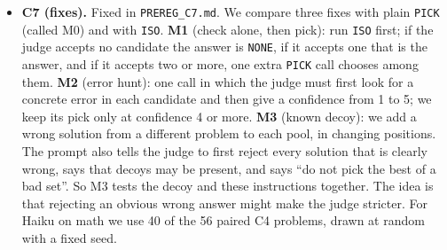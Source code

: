 \documentclass[10pt,twocolumn]{article}
\begin{document}
\begin{itemize}
\item \textbf{C7 (fixes).} Fixed in \texttt{PREREG\_C7.md}. We compare three fixes with plain \texttt{PICK} (called M0) and with \texttt{ISO}. \textbf{M1} (check alone, then pick): run \texttt{ISO} first; if the judge accepts no candidate the answer is \texttt{NONE}, if it accepts one that is the answer, and if it accepts two or more, one extra \texttt{PICK} call chooses among them. \textbf{M2} (error hunt): one call in which the judge must first look for a concrete error in each candidate and then give a confidence from 1 to 5; we keep its pick only at confidence 4 or more. \textbf{M3} (known decoy): we add a wrong solution from a different problem to each pool, in changing positions. The prompt also tells the judge to first reject every solution that is clearly wrong, says that decoys may be present, and says ``do not pick the best of a bad set''. So M3 tests the decoy and these instructions together. The idea is that rejecting an obvious wrong answer might make the judge stricter. For Haiku on math we use 40 of the 56 paired C4 problems, drawn at random with a fixed seed.
\end{itemize}
\end{document}
